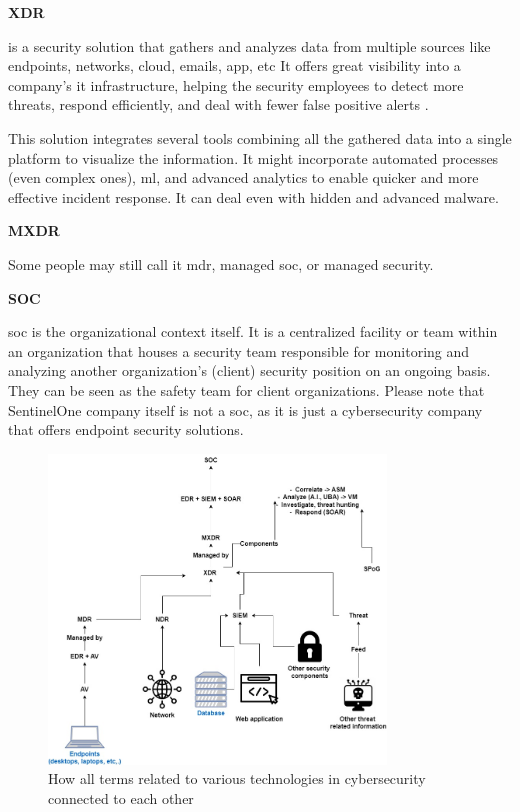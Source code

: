 \begin{multicols}{2}
      \textbf{XDR}

      is a security solution that gathers and analyzes data from multiple sources like endpoints, networks, cloud, emails, app,
      \acrshort{etc} It offers great visibility into a company's \acrshort{it} infrastructure, helping the security employees to detect
      more threats, respond efficiently, and deal with fewer false positive alerts \cite{xdrIDC}.

      This solution integrates several tools combining all the gathered data into a single platform to visualize the information. It might
      incorporate automated processes (even complex ones), \acrshort{ml}, and advanced analytics to enable quicker and more effective
      incident response. It can deal even with hidden and advanced malware.

      \textbf{MXDR}

      Some people may still call it \acrshort{mdr}, managed \acrshort{soc}, or managed security.

      \textbf{SOC}

      \acrshort{soc} is the organizational context itself. It is a centralized facility or team within an organization that houses a
      security team responsible for monitoring and analyzing another organization's (client) security position on an ongoing basis. They
      can be seen as the safety team for client organizations. Please note that SentinelOne company itself is not a \acrshort{soc}, as it
      is just a cybersecurity company that offers endpoint security solutions.

\end{multicols}

\begin{figure}[htbp]
      \centering
      \includegraphics[width=0.8\textwidth]{Figures/XDR.jpg}
      \caption{How all terms related to various technologies in cybersecurity connected to each other}
      \label{fig:xdr}
\end{figure}

